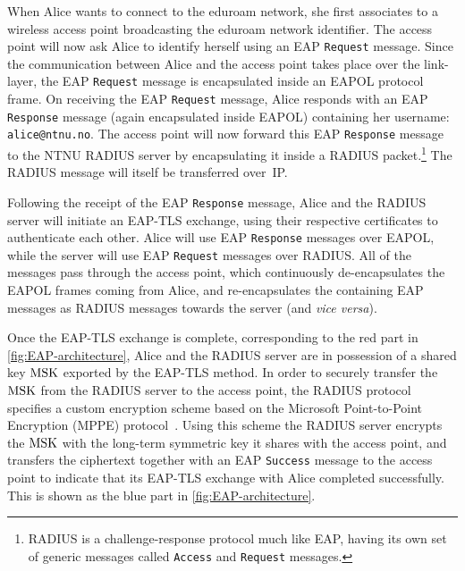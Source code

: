 \begin{example}
When Alice wants to connect to the eduroam network,
she first associates
to a wireless access point broadcasting the eduroam network identifier. 
The access point will now ask Alice to identify herself using an EAP \texttt{Request} message.
Since the communication between Alice and the access point takes place over the link-layer, 
the EAP \texttt{Request} message is encapsulated inside an EAPOL protocol frame. 
On receiving the EAP \texttt{Request} message,
Alice responds with an EAP \texttt{Response} message (again encapsulated inside EAPOL) containing her username: \texttt{alice@ntnu.no}.
The access point will now forward this EAP \texttt{Response} message to the NTNU RADIUS server by encapsulating it inside a RADIUS packet.\footnote{RADIUS is a challenge-response protocol much like EAP,
having its own set of generic messages called \texttt{Access} and \texttt{Request} messages.
}
The RADIUS message will itself be transferred over~IP.

Following the receipt of the EAP \texttt{Response} message, 
Alice and the RADIUS server will initiate an EAP-TLS exchange, 
using their respective certificates to authenticate each other.
Alice will use EAP \texttt{Response} messages over EAPOL,
while the server will use EAP \texttt{Request} messages  over RADIUS.
All of the messages pass through the access point,
which continuously de-encapsulates the EAPOL frames coming from Alice,
and re-encapsulates the containing EAP messages as RADIUS messages towards the server (and \emph{vice versa}). 

Once the EAP-TLS exchange is complete, 
corresponding to the red part in \cref{fig:EAP-architecture},
Alice and the RADIUS server are in possession of a shared key $\mathrm{MSK}$ exported by the EAP-TLS method.
In order to securely transfer the $\mathrm{MSK}$ from the RADIUS server to the access point,
the RADIUS protocol specifies a custom encryption scheme based on the Microsoft Point-to-Point Encryption (MPPE) protocol~\cite{IETF:RFC2548:MS-MPPE-RADIUS-attributes}.
Using this scheme the RADIUS server encrypts the $\mathrm{MSK}$ with the long-term symmetric key it shares with the access point,
and transfers the ciphertext together with an EAP \texttt{Success} message to the access point to indicate that its EAP-TLS exchange with Alice completed successfully.
This is shown as the blue part in \cref{fig:EAP-architecture}.


\end{example}
